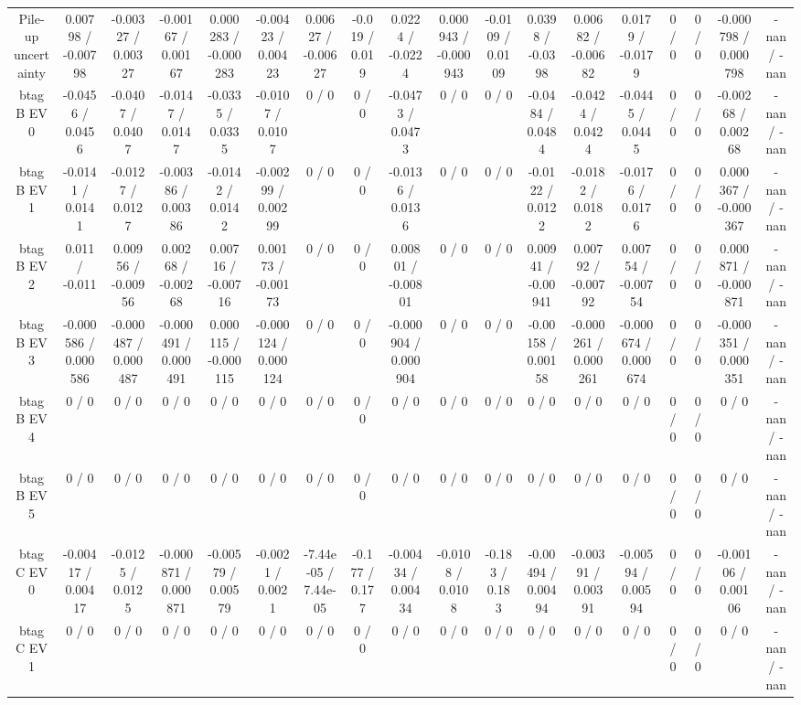 \documentclass[10pt]{article}
\begin{document}
\begin{table}[htbp]
\begin{center}
\begin{tabular}{|c|c|c|c|c|c|c|c|c|c|c|c|c|c|c|c|c|c|}
  Pile-up uncertainty & 0.00798 / -0.00798 & -0.00327 / 0.00327 & -0.00167 / 0.00167 & 0.000283 / -0.000283 & -0.00423 / 0.00423 & 0.00627 / -0.00627 & -0.019 / 0.019 & 0.0224 / -0.0224 & 0.000943 / -0.000943 & -0.0109 / 0.0109 & 0.0398 / -0.0398 & 0.00682 / -0.00682 & 0.0179 / -0.0179 & 0 / 0 & 0 / 0 & -0.000798 / 0.000798 & -nan / -nan \\ 
  btag B EV 0 & -0.0456 / 0.0456 & -0.0407 / 0.0407 & -0.0147 / 0.0147 & -0.0335 / 0.0335 & -0.0107 / 0.0107 & 0 / 0 & 0 / 0 & -0.0473 / 0.0473 & 0 / 0 & 0 / 0 & -0.0484 / 0.0484 & -0.0424 / 0.0424 & -0.0445 / 0.0445 & 0 / 0 & 0 / 0 & -0.00268 / 0.00268 & -nan / -nan \\ 
  btag B EV 1 & -0.0141 / 0.0141 & -0.0127 / 0.0127 & -0.00386 / 0.00386 & -0.0142 / 0.0142 & -0.00299 / 0.00299 & 0 / 0 & 0 / 0 & -0.0136 / 0.0136 & 0 / 0 & 0 / 0 & -0.0122 / 0.0122 & -0.0182 / 0.0182 & -0.0176 / 0.0176 & 0 / 0 & 0 / 0 & 0.000367 / -0.000367 & -nan / -nan \\ 
  btag B EV 2 & 0.011 / -0.011 & 0.00956 / -0.00956 & 0.00268 / -0.00268 & 0.00716 / -0.00716 & 0.00173 / -0.00173 & 0 / 0 & 0 / 0 & 0.00801 / -0.00801 & 0 / 0 & 0 / 0 & 0.00941 / -0.00941 & 0.00792 / -0.00792 & 0.00754 / -0.00754 & 0 / 0 & 0 / 0 & 0.000871 / -0.000871 & -nan / -nan \\ 
  btag B EV 3 & -0.000586 / 0.000586 & -0.000487 / 0.000487 & -0.000491 / 0.000491 & 0.000115 / -0.000115 & -0.000124 / 0.000124 & 0 / 0 & 0 / 0 & -0.000904 / 0.000904 & 0 / 0 & 0 / 0 & -0.00158 / 0.00158 & -0.000261 / 0.000261 & -0.000674 / 0.000674 & 0 / 0 & 0 / 0 & -0.000351 / 0.000351 & -nan / -nan \\ 
  btag B EV 4 & 0 / 0 & 0 / 0 & 0 / 0 & 0 / 0 & 0 / 0 & 0 / 0 & 0 / 0 & 0 / 0 & 0 / 0 & 0 / 0 & 0 / 0 & 0 / 0 & 0 / 0 & 0 / 0 & 0 / 0 & 0 / 0 & -nan / -nan \\ 
  btag B EV 5 & 0 / 0 & 0 / 0 & 0 / 0 & 0 / 0 & 0 / 0 & 0 / 0 & 0 / 0 & 0 / 0 & 0 / 0 & 0 / 0 & 0 / 0 & 0 / 0 & 0 / 0 & 0 / 0 & 0 / 0 & 0 / 0 & -nan / -nan \\ 
  btag C EV 0 & -0.00417 / 0.00417 & -0.0125 / 0.0125 & -0.000871 / 0.000871 & -0.00579 / 0.00579 & -0.0021 / 0.0021 & -7.44e-05 / 7.44e-05 & -0.177 / 0.177 & -0.00434 / 0.00434 & -0.0108 / 0.0108 & -0.183 / 0.183 & -0.00494 / 0.00494 & -0.00391 / 0.00391 & -0.00594 / 0.00594 & 0 / 0 & 0 / 0 & -0.00106 / 0.00106 & -nan / -nan \\ 
  btag C EV 1 & 0 / 0 & 0 / 0 & 0 / 0 & 0 / 0 & 0 / 0 & 0 / 0 & 0 / 0 & 0 / 0 & 0 / 0 & 0 / 0 & 0 / 0 & 0 / 0 & 0 / 0 & 0 / 0 & 0 / 0 & 0 / 0 & -nan / -nan \\ 

\end{tabular}
\end{center}
\end{table}
\end{document}
